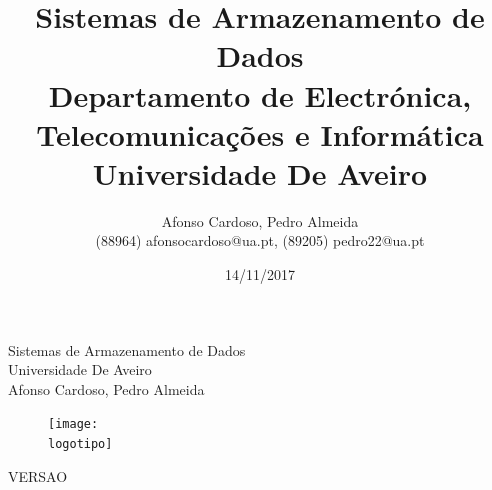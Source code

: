 \documentclass{report}
\begin{document}
%
\def\titulo{Sistemas de Armazenamento de Dados}
\def\data{14/11/2017}
\def\autores{Afonso Cardoso, Pedro Almeida}
\def\autorescontactos{(88964) afonsocardoso@ua.pt, (89205) pedro22@ua.pt}
\def\versao{VERSAO}
\def\departamento{Departamento de Electrónica, Telecomunicações e Informática}
\def\empresa{Universidade De Aveiro}
\def\logotipo{ua.pdf}
%

%
\begin{titlepage}

\begin{center}
%
\vspace*{50mm}
%
{\Huge \titulo}\\ 
%
\vspace{10mm}
%
{\Large \empresa}\\
%
\vspace{10mm}
%
{\LARGE \autores}\\ 
%
\vspace{30mm}
%
\begin{figure}[h]
\center
\texttt{[image: \\logotipo]}
\end{figure}
%
\vspace{30mm}
\end{center}
%
\begin{flushright}
\versao
\end{flushright}
\end{titlepage}

\title{%
{\Huge\textbf{\titulo}}\\
{\Large \departamento\\ \empresa}
}
%
\author{%
    \autores \\
    \autorescontactos
}
%
\date{\data}
%
\maketitle

\end{document}
